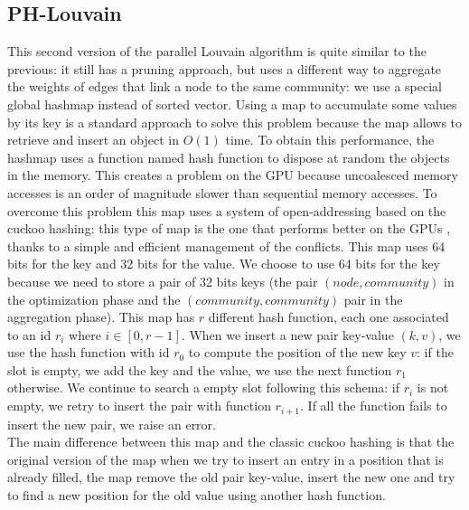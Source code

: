 \subsection{PH-Louvain}
This second version of the parallel Louvain algorithm is quite similar to the previous:
it still has a pruning approach, but uses a different way to aggregate the weights of edges that link a node to the same community: we use a special global hashmap instead of sorted vector.
Using a map to accumulate some values by its key is a standard approach to solve this problem because the map allows to retrieve and insert an object in $O(1)$ time. 
To obtain this performance, the hashmap uses a function named hash function to dispose at random the objects in the memory. This creates a problem on the GPU because uncoalesced memory accesses is an order of magnitude slower than sequential memory accesses. 
To overcome this problem this map uses a system of open-addressing based on the cuckoo hashing: this type of map is the one that performs better on the GPUs \cite{alcantara2012building}, thanks to a simple and efficient management of the conflicts. This map uses 64 bits for the key and 32 bits for the value. We choose to use 64 bits for the key because we need to store a pair of 32 bits keys (the pair $(node, community)$ in the optimization phase and the $(community, community)$ pair in the aggregation phase). This map has $r$ different hash function, each one associated to an id $r_i$ where $i \in [0, r-1]$. When we insert a new pair key-value $(k,v)$, we use the hash function with id $r_0$ to compute the position of the new key $v$: if the slot is empty, we add the key and the value, we use the next function $r_1$ otherwise. We continue to search a empty slot following this schema: if $r_i$ is not empty, we retry to insert the pair with function $r_{i+1}$. If all the function fails to insert the new pair, we raise an error.\\ 
The main difference between this map and the classic cuckoo hashing is that 
the original version of the map when we try to insert an entry in a position that is already filled, the map remove the old pair key-value, insert the new one and try to find a new position for the old value using another hash function.  
